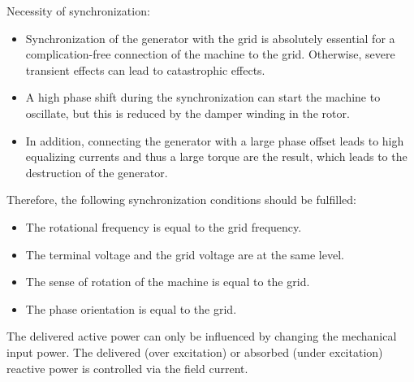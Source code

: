 \begin{solutionblock}
    Necessity of synchronization:
    \begin{itemize}
        \item Synchronization of the generator with the grid is absolutely essential for a complication-free connection of the machine to the grid. Otherwise, severe transient effects can lead to catastrophic effects.
        \item A high phase shift during the synchronization can start the machine to oscillate, but this is reduced by the damper winding in the rotor.
        \item In addition, connecting the generator with a large phase offset leads to high equalizing currents and thus a large torque are the result, which leads to the destruction of the generator.
    \end{itemize}

    Therefore, the following synchronization conditions should be fulfilled:
    \begin{itemize}
        \item The rotational frequency is equal to the grid frequency.
        \item The terminal voltage and the grid voltage are at the same level.
        \item The sense of rotation of the machine is equal to the grid.
        \item The phase orientation is equal to the grid.
    \end{itemize}

\end{solutionblock}





\begin{solutionblock}
    The delivered active power can only be influenced by changing the mechanical input power. The delivered (over excitation) or absorbed (under excitation) reactive power is controlled via the field current.
\end{solutionblock}



